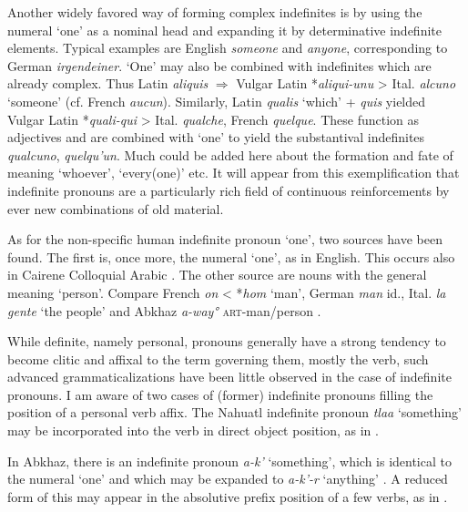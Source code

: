 Another widely favored way of forming complex indefinites is by using the numeral ‘one’ as a nominal head and expanding it by determinative indefinite elements. Typical examples are English \textit{someone} and \textit{anyone}, corresponding to German \textit{irgendeiner}. ‘One’ may also be combined with indefinites which are already complex. Thus Latin \textit{aliquis} $\Rightarrow $ Vulgar Latin *\textit{aliqui-unu} {\textgreater} Ital. \textit{alcuno} ‘someone’ (cf. French \textit{aucun}). Similarly, Latin \textit{qualis} ‘which’ + \textit{quis} yielded Vulgar Latin *\textit{quali-qui} {\textgreater} Ital. \textit{qualche}, French \textit{quelque}. These function as adjectives and are combined with ‘one’ to yield the substantival indefinites \textit{qualcuno}, \textit{quelqu'un}. Much could be added here about the formation and fate of meaning ‘whoever’, ‘every(one)’ etc. It will appear from this exemplification that indefinite pronouns are a particularly rich field of continuous reinforcements by ever new combinations of old material.

As for the non-specific human indefinite pronoun ‘one’, two sources have been found. The first is, once more, the numeral ‘one’, as in English. This occurs also in Cairene Colloquial Arabic \citep[79]{GaryEtAl1982}. The other source are nouns with the general meaning ‘person’. Compare French \textit{on} {\textless} *\textit{hom} ‘man’, German \textit{man} id., Ital. \textit{la gente} ‘the people’ and Abkhaz \textit{a-way°} \textsc{art}{}-man/person \citep[157f]{Hewitt1979}.

While definite, namely personal, pronouns generally have a strong tendency to become clitic and affixal to the term governing them, mostly the verb, such advanced grammaticalizations have been little observed in the case of indefinite pronouns. I am aware of two cases of (former) indefinite pronouns filling the position of a personal verb affix. The Nahuatl indefinite pronoun \textit{tlaa} ‘something’ may be incorporated into the verb in direct object position, as in .

\noindent In Abkhaz, there is an indefinite pronoun \textit{a-k'} ‘something’, which is identical to the numeral ‘one’ and which may be expanded to \textit{a-k'-r} ‘anything’ \citep[158]{Hewitt1979}. A reduced form of this may appear in the absolutive prefix position of a few verbs, as in .

